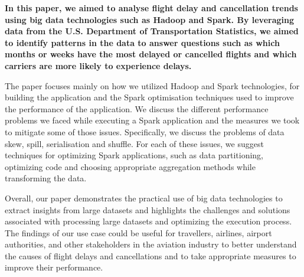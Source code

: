 \textbf{In this paper, we aimed to analyse flight delay and cancellation trends using big data technologies such as Hadoop and Spark. By leveraging data from the U.S. Department of Transportation Statistics, we aimed to identify patterns in the data to answer questions such as which months or weeks have the most delayed or cancelled flights and which carriers are more likely to experience delays.}

The paper focuses mainly on how we utilized Hadoop and Spark technologies, for building the application and the Spark optimisation techniques used to improve the performance of the application. We discuss the different performance problems we faced while executing a Spark application and the measures we took to mitigate some of those issues. Specifically, we discuss the problems of data skew, spill, serialisation and shuffle. For each of these issues, we suggest techniques for optimizing Spark applications, such as data partitioning, optimizing code and choosing appropriate aggregation methods while transforming the data.

Overall, our paper demonstrates the practical use of big data technologies to extract insights from large datasets and highlights the challenges and solutions associated with processing large datasets and optimizing the execution process. The findings of our use case could be useful for travellers, airlines, airport authorities, and other stakeholders in the aviation industry to better understand the causes of flight delays and cancellations and to take appropriate measures to improve their performance.

